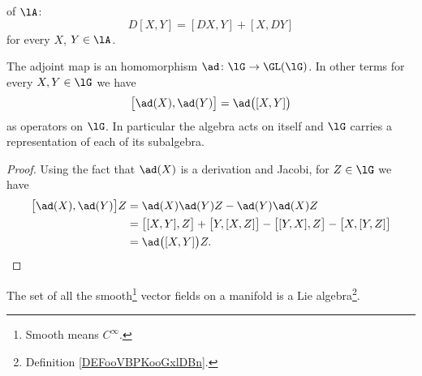 \begin{definition}      \label{DEFooDUEUooZLhKdv}
	 of $\lA$:
	\begin{equation}
		D[X,Y]=[DX,Y]+[X,DY]
	\end{equation}
	for every $X$, $Y\in\lA$.
\end{definition}

\begin{lemma}       \label{LemadhomomadXadYadXY}
	The adjoint map is an homomorphism \( \ad\colon \lG\to \GL(\lG)\). In other terms for every \( X,Y\in\lG\) we have
	\begin{equation}
		\big[ \ad(X),\ad(Y) \big]=\ad\big( [X,Y] \big)
	\end{equation}
	as operators on \( \lG\). In particular the algebra acts on itself and \( \lG\) carries a representation of each of its subalgebra.
\end{lemma}

\begin{proof}
	Using the fact that \( \ad(X)\) is a derivation and Jacobi, for \( Z\in\lG\) we have
	\begin{subequations}
		\begin{align}
			\big[ \ad(X),\ad(Y) \big]Z & =\ad(X)\ad(Y)Z-\ad(Y)\ad(X)Z                                                     \\
			                           & =\big[ [X,Y],Z \big]+\big[ Y,[X,Z] \big]-\big[ [Y,X],Z \big]-\big[ X,[Y,Z] \big] \\
			                           & =\ad\big( [X,Y] \big)Z.
		\end{align}
	\end{subequations}
\end{proof}

\begin{proposition}       \label{PROPooSWQSooSEfTuX}
	The set of all the smooth\footnote{Smooth means \( C^{\infty}\).} vector fields on a manifold is a Lie algebra\footnote{Definition \ref{DEFooVBPKooGxlDBn}.}.
\end{proposition}

